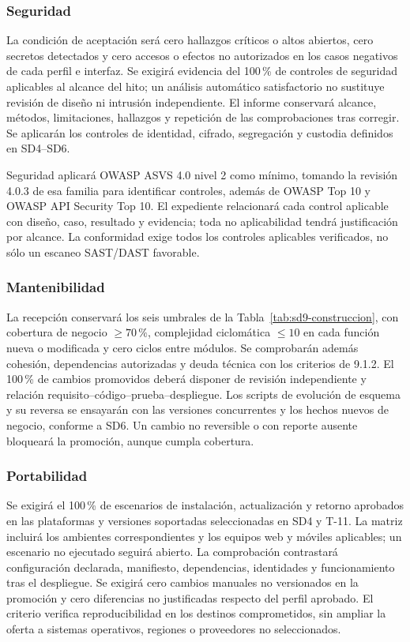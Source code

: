 \subsubsection{Seguridad}
La condición de aceptación será cero hallazgos críticos o altos abiertos, cero secretos detectados y cero accesos o efectos no autorizados en los casos negativos de cada perfil e interfaz. Se exigirá evidencia del 100\,\% de controles de seguridad aplicables al alcance del hito; un análisis automático satisfactorio no sustituye revisión de diseño ni intrusión independiente. El informe conservará alcance, métodos, limitaciones, hallazgos y repetición de las comprobaciones tras corregir. Se aplicarán los controles de identidad, cifrado, segregación y custodia definidos en SD4--SD6. \parencite[20.1, p.~34; RT-11.20/22, p.~24]{sd9-bt}

Seguridad aplicará OWASP ASVS 4.0 nivel 2 como mínimo, tomando la revisión 4.0.3 de esa familia para identificar controles, además de OWASP Top 10 y OWASP API Security Top 10. El expediente relacionará cada control aplicable con diseño, caso, resultado y evidencia; toda no aplicabilidad tendrá justificación por alcance. La conformidad exige todos los controles aplicables verificados, no sólo un escaneo SAST/DAST favorable. \parencites{sd9-asvs}[sec.~11.5, p.~25]{sd9-bt}

\subsubsection{Mantenibilidad}
La recepción conservará los seis umbrales de la Tabla~\ref{tab:sd9-construccion}, con cobertura de negocio $\geq70\,\%$, complejidad ciclomática $\leq10$ en cada función nueva o modificada y cero ciclos entre módulos. Se comprobarán además cohesión, dependencias autorizadas y deuda técnica con los criterios de 9.1.2. El 100\,\% de cambios promovidos deberá disponer de revisión independiente y relación requisito--código--prueba--despliegue. Los scripts de evolución de esquema y su reversa se ensayarán con las versiones concurrentes y los hechos nuevos de negocio, conforme a SD6. Un cambio no reversible o con reporte ausente bloqueará la promoción, aunque cumpla cobertura. \parencite[art.~24, p.~17]{sd9-ba}

\subsubsection{Portabilidad}
Se exigirá el 100\,\% de escenarios de instalación, actualización y retorno aprobados en las plataformas y versiones soportadas seleccionadas en SD4 y T-11. La matriz incluirá los ambientes correspondientes y los equipos web y móviles aplicables; un escenario no ejecutado seguirá abierto. La comprobación contrastará configuración declarada, manifiesto, dependencias, identidades y funcionamiento tras el despliegue. Se exigirá cero cambios manuales no versionados en la promoción y cero diferencias no justificadas respecto del perfil aprobado. El criterio verifica reproducibilidad en los destinos comprometidos, sin ampliar la oferta a sistemas operativos, regiones o proveedores no seleccionados. \parencite[art.~24, p.~17]{sd9-ba}

